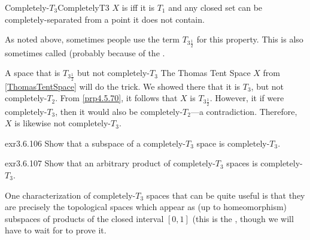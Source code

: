 \begin{dfn}{Completely-$T_3$}{CompletelyT3}
$X$ is  iff it is $T_1$ and any closed set can be completely-separated from a point it does not contain.
\begin{rmk}
As noted above, sometimes people use the term $T_{3\frac{1}{2}}$ for this property.  This is also sometimes called  (probably because of the .
\end{rmk}
\end{dfn}
\begin{exm}{A space that is $T_{3\frac{1}{2}}$ but not completely-$T_3$}{}
The Thomas Tent Space $X$ from \cref{ThomasTentSpace} will do the trick.  We showed there that it is $T_3$, but not completely-$T_2$.  From \cref{prp4.5.70}, it follows that $X$ is $T_{3\frac{1}{2}}$.  However, it if were completely-$T_3$, then it would also be completely-$T_2$---a contradiction.  Therefore, $X$ is likewise not completely-$T_3$.
\end{exm}
\begin{exr}{}{exr3.6.106}
Show that a subspace of a completely-$T_3$ space is completely-$T_3$.
\end{exr}
\begin{exr}{}{exr3.6.107}
Show that an arbitrary product of completely-$T_3$ spaces is completely-$T_3$.
\end{exr}
One characterization of completely-$T_3$ spaces that can be quite useful is that they are precisely the topological spaces which appear as (up to homeomorphism) subspaces of products of the closed interval $[0,1]$ (this is the , though we will have to wait for  to prove it.

